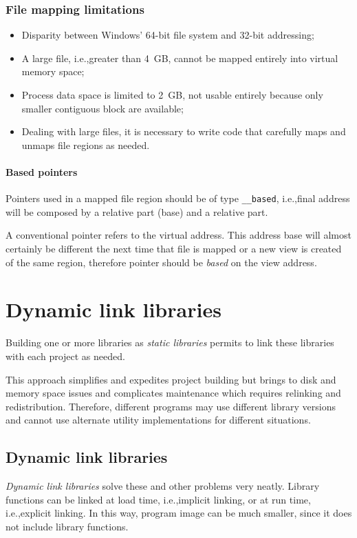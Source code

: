 \subsubsection{File mapping limitations}
\begin{itemize}
\item Disparity between Windows' 64-bit file system and 32-bit addressing;
\item A large file, i.e.,\@ greater than 4~GB, cannot be mapped entirely into virtual memory space;
\item Process data space is limited to 2~GB, not usable entirely because only smaller contiguous block are available;
\item Dealing with large files, it is necessary to write code that carefully maps and unmaps file regions as needed.
\end{itemize}

\paragraph{Based pointers}
Pointers used in a mapped file region should be of type \texttt{\_\_based}, i.e.,\@ final address will be composed by a relative part (base) and a relative part.

A conventional pointer refers to the virtual address. This address base will almost certainly be different the next time that file is mapped or a new view is created of the same region, therefore pointer should be \emph{based} on the view address.

\section{Dynamic link libraries}
Building one or more libraries as \emph{static libraries} permits to link these libraries with each project as needed.

This approach simplifies and expedites project building but brings to disk and memory space issues and complicates maintenance which requires relinking and redistribution. Therefore, different programs may use different library versions and cannot use alternate utility implementations for different situations.

\subsection{Dynamic link libraries}
\emph{Dynamic link libraries} solve these and other problems very neatly. Library functions can be linked at load time, i.e.,\@ implicit linking, or at run time, i.e.,\@ explicit linking. In this way, program image can be much smaller, since it does not include library functions.

